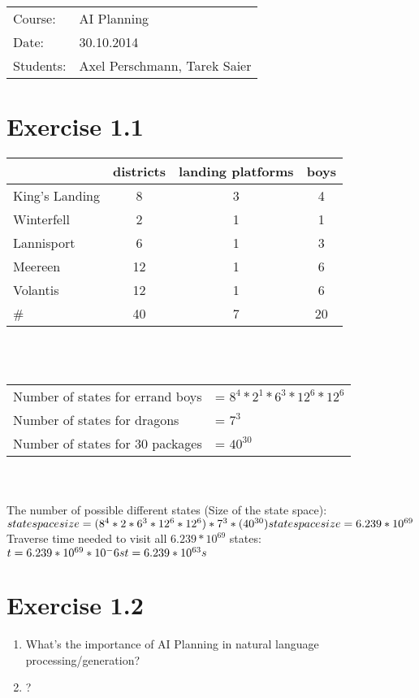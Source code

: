 \documentclass[11pt,a4paper]{report}
\begin{document}
\setcounter{chapter}{1}

\begin{tabular}{ll}
Course: & AI Planning\\
Date: & 30.10.2014\\
Students: & Axel Perschmann, Tarek Saier
\end{tabular}

\section{Exercise 1.1}
\begin{tabular}{ l | c c c }
     & districts & landing platforms & boys \\
  \hline
  King's Landing &  8 & 3 & 4\\
  Winterfell &  2 & 1 & 1\\
  Lannisport &  6 & 1 & 3\\
  Meereen & 12 & 1 & 6\\
  Volantis & 12 & 1 & 6\\
  \hline
  \#  & 40 & 7 & 20
\end{tabular}\\\\

\begin{tabular}{ll}
Number of states for errand boys & = $8^4 * 2^1 * 6^3 * 12^6 * 12^6$ \\
Number of states for dragons & = $7^3$ \\
Number of states for 30 packages &= $40^{30}$
\end{tabular}\\\\

The number of possible different states (Size of the state space):\\
$state space size = (8^4 * 2 * 6^3 * 12^6 * 12^6)  *  7^3  * (40^{30})\\
state space size= 6.239 * 10^{69}$\\

Traverse time needed to visit all $6.239 * 10^{69}$ states:\\
$t = 6.239 * 10^{69} * 10^-6s\\
t = 6.239 * 10^{63}s$

\section{Exercise 1.2}

\begin{enumerate}
\item
What's the importance of AI Planning in natural language processing/generation?
\item
?
\end{enumerate}
\end{document}
